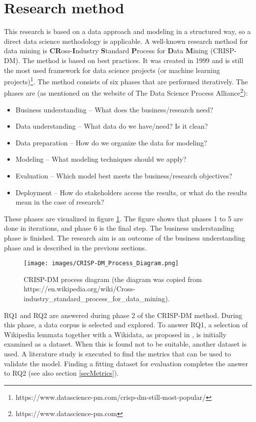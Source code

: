 \section{Research method}
\label{secCrispdm}
This research is based on a data approach and modeling in a structured way, so a direct data science methodology is applicable.
A well-known research method for data mining is \textbf{CR}oss-\textbf{I}ndustry \textbf{S}tandard \textbf{P}rocess for \textbf{D}ata \textbf{M}ining (CRISP-DM). The method is based on best practices. It was created in 1999 and is still the most used framework for data science projects (or machine learning projects)\footnote{https://www.datascience-pm.com/crisp-dm-still-most-popular/}. 
The method consists of six phases that are performed iteratively. The phases are (as mentioned on the website of The Data Science Process Alliance\footnote{https://www.datascience-pm.com}): 
\begin{itemize}
  \item[1] Business understanding – What does the business/research need?
  \item[2] Data understanding – What data do we have/need? Is it clean?
  \item[3] Data preparation – How do we organize the data for modeling?
  \item[4] Modeling – What modeling techniques should we apply?
  \item[5] Evaluation – Which model best meets the business/research objectives?
  \item[6] Deployment – How do stakeholders access the results, or what do the results mean in the case of research?
\end{itemize}
These phases are visualized in figure \ref{imgcrisp}. The figure shows that phases 1 to 5 are done in iterations, and phase 6 is the final step. The business understanding phase is finished. The research aim is an outcome of the business understanding phase and is described in the previous sections. \\


\begin{figure}[h]
\centering
\captionsetup{justification=centering}
\texttt{[image: images/CRISP-DM\_Process\_Diagram.png]}
\caption{CRISP-DM process diagram (the diagram was copied from https://en.wikipedia.org/wiki/Cross-industry\_standard\_process\_for\_data\_mining).}
\label{imgcrisp}
\end{figure}

RQ1 and RQ2 are answered during phase 2 of the CRISP-DM method. During this phase, a data corpus is selected and explored. To answer RQ1, a selection of Wikipedia lemmata together with a Wikidata, as proposed in \citep{ostendorff2020pairwise}, is initially examined as a dataset. When this is found not to be suitable, another dataset is used. A literature study is executed to find the metrics that can be used to validate the model. Finding a fitting dataset for evaluation completes the answer to RQ2 (see also section \ref{secMetrics}).\\

